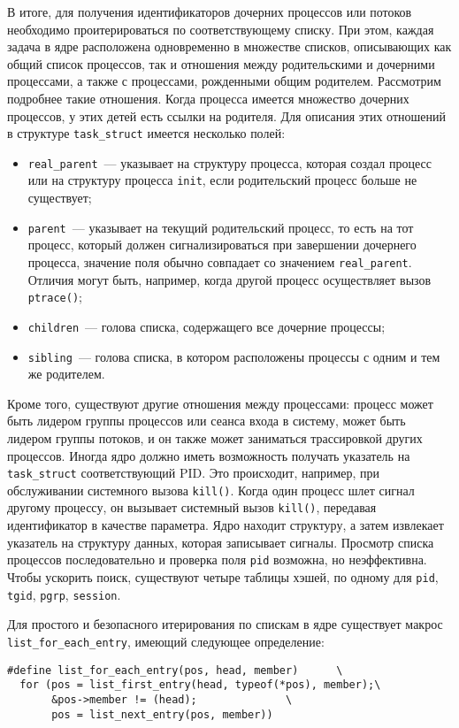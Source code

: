 В итоге, для получения идентификаторов дочерних процессов или потоков необходимо
проитерироваться по соответствующему списку. При этом, каждая задача в ядре
расположена одновременно в множестве списков, описывающих как общий список
процессов, так и отношения между родительскими и дочерними процессами, а также с
процессами, рожденными общим родителем.
Рассмотрим подробнее такие отношения. Когда процесса имеется множество
дочерних процессов, у этих детей есть ссылки на родителя. Для описания этих
отношений в структуре \texttt{task\_struct} имеется несколько полей:
\begin{itemize}
\item \texttt{real\_parent}~--- указывает на структуру процесса, которая создал
  процесс или на структуру процесса \texttt{init}, если родительский процесс
  больше не существует;
\item \texttt{parent}~--- указывает на текущий родительский процесс, то есть на
  тот процесс, который должен сигнализироваться при завершении дочернего
  процесса, значение поля обычно совпадает со значением \texttt{real\_parent}.
  Отличия могут быть, например, когда другой процесс осуществляет вызов
  \texttt{ptrace()};
\item \texttt{children}~--- голова списка, содержащего все дочерние процессы;
\item \texttt{sibling}~--- голова списка, в котором расположены процессы с одним
  и тем же родителем.
\end{itemize}

Кроме того, существуют другие отношения между процессами: процесс может быть
лидером группы процессов или сеанса входа в систему, может быть лидером группы
потоков, и он также может заниматься трассировкой других процессов. Иногда ядро
должно иметь возможность получать указатель на \texttt{task\_struct}
соответствующий PID. Это происходит, например, при обслуживании системного
вызова \texttt{kill()}. Когда один процесс шлет сигнал другому процессу, он
вызывает системный вызов \texttt{kill()}, передавая идентификатор в качестве
параметра. Ядро находит структуру, а затем извлекает указатель на структуру
данных, которая записывает сигналы. Просмотр списка процессов последовательно и
проверка поля \texttt{pid} возможна, но неэффективна. Чтобы ускорить поиск,
существуют четыре таблицы хэшей, по одному для \texttt{pid}, \texttt{tgid},
\texttt{pgrp}, \texttt{session}.

Для простого и безопасного итерирования по спискам в ядре существует макрос
\texttt{list\_for\_each\_entry}, имеющий следующее определение:
\medskip
\begin{lstlisting}[style=cstyle]
#define list_for_each_entry(pos, head, member)		\
  for (pos = list_first_entry(head, typeof(*pos), member);\
       &pos->member != (head);				\
       pos = list_next_entry(pos, member))
\end{lstlisting}
\medskip

